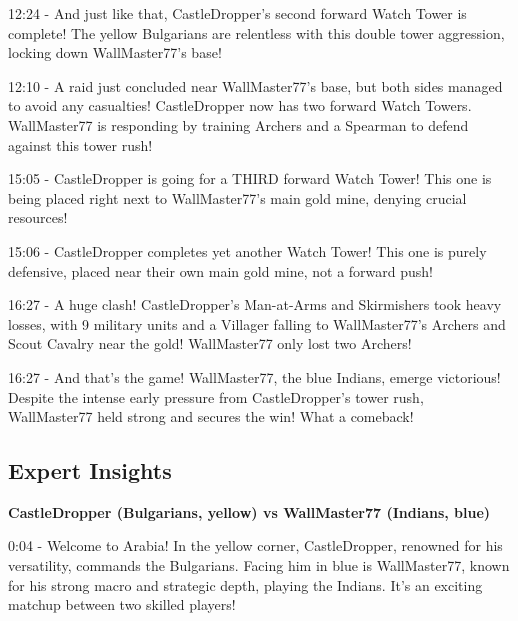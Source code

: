 12:24 - And just like that, CastleDropper's second forward Watch Tower is complete! The yellow Bulgarians are relentless with this double tower aggression, locking down WallMaster77's base! \par \vspace{1em}

12:10 - A raid just concluded near WallMaster77's base, but both sides managed to avoid any casualties! CastleDropper now has two forward Watch Towers. WallMaster77 is responding by training Archers and a Spearman to defend against this tower rush! \par \vspace{1em}

15:05 - CastleDropper is going for a THIRD forward Watch Tower! This one is being placed right next to WallMaster77's main gold mine, denying crucial resources! \par \vspace{1em}

15:06 - CastleDropper completes yet another Watch Tower! This one is purely defensive, placed near their own main gold mine, not a forward push! \par \vspace{1em}

16:27 - A huge clash! CastleDropper's Man-at-Arms and Skirmishers took heavy losses, with 9 military units and a Villager falling to WallMaster77's Archers and Scout Cavalry near the gold! WallMaster77 only lost two Archers! \par \vspace{1em}

16:27 - And that's the game! WallMaster77, the blue Indians, emerge victorious! Despite the intense early pressure from CastleDropper's tower rush, WallMaster77 held strong and secures the win! What a comeback! \par \vspace{1em}

\subsection{Expert Insights}
\textbf{CastleDropper (Bulgarians, yellow) vs WallMaster77 (Indians, blue)}

0:04 - Welcome to Arabia! In the yellow corner, CastleDropper, renowned for his versatility, commands the Bulgarians. Facing him in blue is WallMaster77, known for his strong macro and strategic depth, playing the Indians. It's an exciting matchup between two skilled players! \par \vspace{1em}

